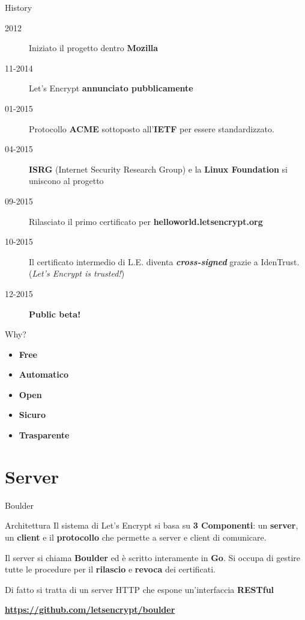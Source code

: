 \documentclass[xcolor=svgnames,11pt]{beamer}
\begin{document}
\begin{frame}{History}
\begin{description}
  \item[2012] Iniziato il progetto dentro \textbf{Mozilla}
  \pause
  \item[11-2014] Let's Encrypt \textbf{annunciato pubblicamente}
  \pause
  \item[01-2015] Protocollo \textbf{ACME} sottoposto all'\textbf{IETF} per essere standardizzato.
  \pause
  \item[04-2015] \textbf{ISRG} (Internet Security Research Group) e la \textbf{Linux Foundation}
  si uniscono al progetto
  \pause
  \item[09-2015] Rilasciato il primo certificato per \textbf{helloworld.letsencrypt.org}
  \pause
  \item[10-2015] Il certificato intermedio di L.E. diventa \textbf{\emph{cross-signed}} grazie a IdenTrust.
  (\emph{Let's Encrypt is trusted!})
  \pause
  \item[12-2015] \textbf{Public beta!}
\end{description}
\end{frame}

\begin{frame}{Why?}
\begin{itemize}
  \item \textbf{Free}
  \item \textbf{Automatico}
  \item \textbf{Open}
  \item \textbf{Sicuro}
  \item \textbf{Trasparente}
\end{itemize}
\end{frame}

\section{Server}
\begin{frame}{Boulder}
\begin{block}{Architettura}
Il sistema di Let's Encrypt si basa su \textbf{3 Componenti}: un \textbf{server},
un \textbf{client} e il \textbf{protocollo} che permette a server e client di comunicare.
\end{block}

\medskip \pause

Il server si chiama \textbf{Boulder} ed è scritto interamente in \textbf{Go}.
Si occupa di gestire tutte le procedure per il \textbf{rilascio} e \textbf{revoca} dei certificati.

\medskip \pause

Di fatto si tratta di un server HTTP che espone un'interfaccia \textbf{RESTful}

\medskip \pause

\begin{center}
 \textbf{\url{https://github.com/letsencrypt/boulder}}
\end{center}
\end{frame}
\end{document}
